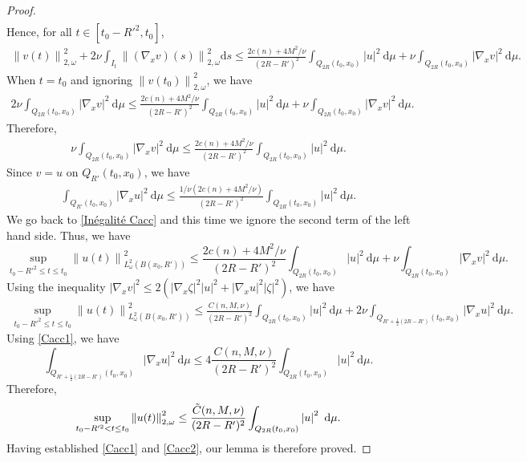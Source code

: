 \documentclass[12pt, letterpaper]{amsart}
\theoremstyle{definition}
\theoremstyle{remark}
\numberwithin{equation}{section}
\begin{document}
\begin{proof}
\begin{align*}
\end{align*}
Hence, for all $t \in [t_0-R'^2,t_0]$,
\begin{align}\label{Inégalité Cacc}
 \left \| v(t) \right \|^2_{2,\omega}+ 2 \nu \int_{I_t} \left \| \left ( \nabla_x v \right )(s) \right \|_{2,\omega}^2 \mathrm ds \leq \frac{2c(n)+4M^2/\nu }{(2R-R')^2} \int_{Q_{2R}(t_0,x_0)} \left |  u \right |^2 \ \mathrm d\mu + \nu \int_{Q_{2R}(t_0,x_0)} \left | \nabla_x v \right |^2 \ \mathrm d\mu.
\end{align}
When $t=t_0$ and ignoring $\left \| v(t_0) \right \|^2_{2,\omega}$, we have 
\begin{align*}
    2\nu \int_{Q_{2R}(t_0,x_0)} \left | \nabla_x v \right |^2 \ \mathrm d\mu   \leq \frac{ 2c(n)+4M^2/\nu }{(2R-R')^2} \int_{Q_{2R}(t_0,x_0)} \left |  u \right |^2 \ \mathrm d\mu + \nu \int_{Q_{2R}(t_0,x_0)} \left | \nabla_x v \right |^2 \ \mathrm d\mu.
\end{align*}
Therefore,
\begin{align*}
     \nu \int_{Q_{2R}(t_0,x_0)} \left | \nabla_x v \right |^2 \ \mathrm d\mu \leq \frac{2c(n)+4M^2/\nu }{(2R-R')^2} \int_{Q_{2R}(t_0,x_0)} \left |  u \right |^2 \ \mathrm d\mu.
\end{align*}
Since $v = u$ on $Q_{R'}(t_0,x_0)$, we have 
\begin{align}\label{Cacc1}
      \int_{Q_{R'}(t_0,x_0)} \left | \nabla_x u \right |^2 \ \mathrm d\mu \leq \frac{1/\nu\left (2c(n)+4M^2/\nu \right )}{(2R-R')^2} \int_{Q_{2R}(t_0,x_0)} \left |  u \right |^2 \ \mathrm d\mu.
\end{align}
We go back to \eqref{Inégalité Cacc} and this time we ignore the second term of the left hand side. Thus, we have 
$$\sup_{t_0-R'^2 \leq t \leq t_0 } \left\|u(t) \right\|^2_{L^2_\omega(B(x_0,R'))} \leq \frac{2c(n)+4M^2/\nu }{(2R-R')^2} \int_{Q_{2R}(t_0,x_0)} \left |  u \right |^2 \ \mathrm d\mu + \nu \int_{Q_{2R}(t_0,x_0)} \left | \nabla_x v \right |^2 \ \mathrm d\mu.$$
Using the inequality $\left|\nabla_x v \right|^2 \leq 2 \left ( \left|\nabla_x \zeta \right|^2 \left|u \right|^2+ \left|\nabla_x u \right|^2 \left|\zeta \right|^2 \right )$, we have 
\begin{align*}
    \sup_{t_0-R'^2 \leq t \leq t_0 } \left\|u(t) \right\|^2_{L^2_\omega(B(x_0,R'))} \leq \frac{C(n,M,\nu)}{(2R-R')^2} \int_{Q_{2R}(t_0,x_0)} \left |  u \right |^2 \ \mathrm d\mu + 2\nu \int_{Q_{R'+\frac{1}{2}(2R-R')}(t_0,x_0)} \left | \nabla_x u \right |^2 \ \mathrm d\mu.
\end{align*}
Using \eqref{Cacc1}, we have 
$$\int_{Q_{R'+\frac{1}{2}(2R-R')}(t_0,x_0)} \left | \nabla_x u \right |^2 \ \mathrm d\mu \leq  4\frac{C(n,M,\nu)}{(2R-R')^2} \int_{Q_{2R}(t_0,x_0)} \left |  u \right |^2 \ \mathrm d\mu.$$
Therefore, 
\begin{equation}\label{Cacc2}
    \sup_{t_0-R'^2 < t \leq t_0 } \left\|u(t) \right\|^2_{2,\omega} \leq \frac{\Tilde{C}(n,M,\nu) }{(2R-R')^2} \int_{Q_{2R}(t_0,x_0)} \left |  u \right |^2 \ \mathrm d\mu.
\end{equation}
Having established \eqref{Cacc1} and \eqref{Cacc2}, our lemma is therefore proved.
\end{proof}
\end{document}

